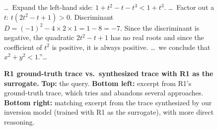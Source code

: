 \begin{figure}[h]
\begin{minipage}[t]{0.485\textwidth}
\begin{tcolorbox}
  \ldots\ Expand the left-hand side: $1 + t^2 - t - t^3 < 1 + t^3$. \ldots\ Factor out a $t$: $t(2t^2 - t + 1) > 0$. Discriminant $D = (-1)^2 - 4 \times 2 \times 1 = 1 - 8 = -7$. Since the discriminant is negative, the quadratic $2t^2 - t + 1$ has no real roots and since the coefficient of $t^2$ is positive, it is always positive. \ldots\ we conclude that $x^2 + y^2 < 1$.''\ldots
  \end{tcolorbox}
\end{minipage}
  \caption{\textbf{R1 ground-truth trace vs.\ synthesized trace with R1 as the surrogate.} \textbf{Top:} the query. \textbf{Bottom left:} excerpt from R1's ground-truth trace, which tries and abandons several approaches.
  \textbf{Bottom right:} matching excerpt from the trace synthesized by our inversion model (trained with R1 as the surrogate), with more direct reasoning.}
  \label{fig:r1_vs_inverter_backtrack}
\end{figure}
